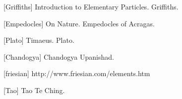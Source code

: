 [Griffiths] Introduction to Elementary Particles. Griffiths.

[Empedocles] On Nature. Empedocles of Acragas.

[Plato] Timaeus. Plato.

[Chandogya] Chandogya Upanishad.

[friesian] http://www.friesian.com/elements.htm

[Tao] Tao Te Ching.